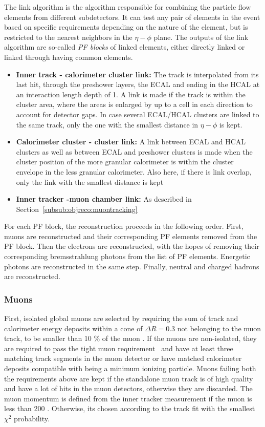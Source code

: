 The link algorithm is the algorithm responsible for combining the particle flow elements from different subdetectors.
It can test any pair of elements in the event based on specific requirements depending on the nature of the element, but is restricted to the nearest neighbors in the $\eta-\phi$ plane.
The outputs of the link algorithm are so-called \textit{PF blocks} of linked elements, either directly linked or linked through having common elements.
\begin{itemize}
  \item \textbf{Inner track - calorimeter cluster link:} The track is interpolated from its last hit, through the preshower layers, the ECAL and ending in the HCAL at an interaction length depth of 1. A link is made if the track is within the cluster area, where the areas is enlarged by up to a cell in each direction to account for detector gaps. In case several ECAL/HCAL clusters are linked to the same track, only the one with the smallest distance in $\eta-\phi$ is kept.

\item \textbf{Calorimeter cluster - cluster link:} A link between ECAL and HCAL clusters as well as between ECAL and preshower clusters
is made when the cluster position of the more granular calorimeter is within the cluster envelope in the less granular calorimeter. Also here, if there is link overlap, only the link with the smallest distance is kept

\item \textbf{Inner tracker -muon chamber link:} As described in Section~\ref{subsub:objreco:muontracking} 
\end{itemize}

For each PF block, the reconstruction proceeds in the following order.
First, muons are reconstructed and their corresponding PF elements removed from the PF block. Then the electrons are reconstructed, with the hopes of removing their corresponding bremsstrahlung photons from the list of PF elements. Energetic photons are reconstructed in the same step. Finally, neutral and charged hadrons are reconstructed.

\subsubsection{Muons}

First, isolated global muons are selected by requiring the sum of track \PT and calorimeter energy deposits within a cone of $\Delta R = 0.3$ not belonging to the muon track, to be smaller than 10 \% of the muon \PT.
If the muons are non-isolated, they are required to pass the tight muon requirement~\cite{1748-0221-7-10-P10002} and have at least three matching track segments in the muon detector or have matched calorimeter deposits compatible with being a minimum ionizing particle.
Muons failing both the requirements above are kept if the standalone muon track is of high quality and have a lot of hits in the muon detectors, otherwise they are discarded.
The muon momentum is defined from the inner tracker measurement if the muon \PT is less than 200 \GeV. Otherwise, its chosen according to the track fit with the smallest $\chi^2$ probability.

